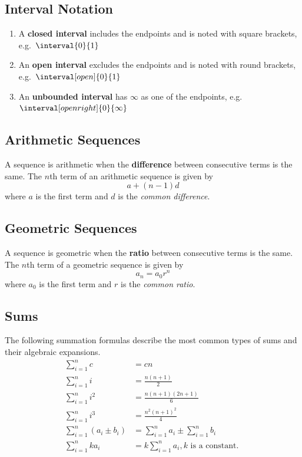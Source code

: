 \subsection{Interval Notation}
\begin{enumerate}
	\item A \textbf{closed interval} includes the endpoints and is noted with square brackets, e.g.\ \( \interval{0}{1} \)
	\item An \textbf{open interval} excludes the endpoints and is noted with round brackets, e.g.\ \( \interval[open]{0}{1} \)
	\item An \textbf{unbounded interval} has \( \infty \) as one of the endpoints, e.g.\ \( \interval[open right]{0}{\infty}\)

\end{enumerate}

\subsection{Arithmetic Sequences}
A sequence is arithmetic when the \textbf{difference} between consecutive terms is the same. The \(n\)th term of an arithmetic sequence is given by
\begin{equation}
	a+(n-1) d
\end{equation}
where \(a\) is the first term and \(d\) is the \emph{common difference}.
\subsection{Geometric Sequences}
A sequence is geometric when the \textbf{ratio} between consecutive terms is the same. The \(n\)th term of a geometric sequence is given by
\begin{equation}
	a_n = a_0 r^{n}
\end{equation}
where \(a_0\) is the first term and \(r\) is the \emph{common ratio}.

\subsection{Sums}
The following summation formulas describe the most common types of sums and their algebraic expansions.
\begin{align}
	\sum_{i=1}^{n} c                           & =cn                                             \\
	\sum_{i=1}^{n} i                           & =\frac{n(n+1)}{2}                                   \\
	\sum_{i=1}^{n} i^{2}                       & =\frac{n(n+1)(2 n+1)}{6}                            \\
	\sum_{i=1}^{n} i^{3}                       & =\frac{n^{2}{(n+1)}^{2}}{4}                         \\
	\sum_{i=1}^{n}\left(a_{i} \pm b_{i}\right) & =\sum_{i=1}^{n} a_{i} \pm \sum_{i=1}^{n} b_{i}      \\
	\sum_{i=1}^{n} k a_{i}                     & =k \sum_{i=1}^{n} a_{i}, k \text { is a constant. }
\end{align}
